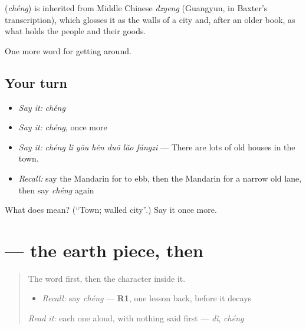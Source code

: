 \begin{cousinweb}
\textbf{} (\emph{chéng}) is inherited from Middle Chinese \emph{dzyeng} (Guangyun, in Baxter's transcription), which glosses it as the walls of a city and, after an older book, as what holds the people and their goods.
\end{cousinweb}

\begin{grammarlens}[title={What you've built}]
One more word for getting around.
\end{grammarlens}

\subsection*{Your turn}
\begin{itemize}
\raggedright
  \item \emph{Say it:} \emph{chéng}
  \item \emph{Say it:} \emph{chéng}, once more
  \item \emph{Say it:} \emph{chéng lǐ yǒu hěn duō lǎo fángzi} — There are lots of old houses in the town.
  \item \emph{Recall:} say the Mandarin for to ebb, then the Mandarin for a narrow old lane, then say \emph{chéng} again
\end{itemize}

\begin{tcolorbox}[breakable,colback=teal!4,colframe=teal!35!black,title={Before you move on}]
What does  mean? (\textquotedblleft{}Town; walled city\textquotedblright{}.) Say it once more.
\end{tcolorbox}
\section[\texorpdfstring{\zh{城} (chéng)}{城 (chéng)}]{ — the earth piece, then }

\label{lesson:ZH-W446-cheng-town}



\begin{quote}
The word first, then the character inside it.

\begin{itemize}
\raggedright
  \item \emph{Recall:} say \emph{chéng} — \textbf{R1}, one lesson back, before it decays
\end{itemize}

\begin{quote}
 
\end{quote}

\emph{Read it:} each one aloud, with nothing said first — \emph{dì}, \emph{chéng}
\end{quote}

